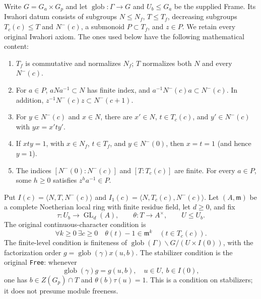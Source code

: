 \documentclass[11pt,a4paper]{article}
\numberwithin{equation}{section}
\theoremstyle{remark}\newtheorem{remark}[theorem]{Remark}
\begin{document}
Write $G=G_a\times G_p$ and let $\operatorname{glob}:\Gamma\to G$
and $U_b\leq G_a$ be the supplied Frame.  Its Iwahori datum consists of
subgroups $N\leq N_f$, $T\leq T_f$, decreasing subgroups
$T_c(c)\leq T$ and $N^-(c)$, a submonoid $P\subset T_f$, and
$z\in P$.  We retain every original Iwahori axiom.  The ones used
below have the following mathematical content:

\begin{enumerate}
\item $T_f$ is commutative and normalizes $N_f$; $T$ normalizes
both $N$ and every $N^-(c)$.
\item For $a\in P$, $aNa^{-1}\subset N$ has finite index, and
$a^{-1}N^-(c)a\subset N^-(c)$.  In addition,
$z^{-1}N^-(c)z\subset N^-(c+1)$.
\item For $y\in N^-(c)$ and $x\in N$, there are
$x'\in N$, $t\in T_c(c)$, and $y'\in N^-(c)$ with
$yx=x'ty'$.
\item If $xty=1$, with $x\in N_f$, $t\in T_f$, and
$y\in N^-(0)$, then $x=t=1$ (and hence $y=1$).
\item The indices $[N^-(0):N^-(c)]$ and $[T:T_c(c)]$ are
finite.  For every $a\in P$, some $h\geq0$ satisfies
$z^h a^{-1}\in P$.
\end{enumerate}

Put $I(c)=\langle N,\allowbreak{} T,\allowbreak{} N^-(c)\rangle$ and
$I_1(c)=\langle N,\allowbreak{} T_c(c),\allowbreak{} N^-(c)\rangle$.  Let $(A,\mathfrak m)$
be a complete Noetherian local ring with finite residue field, let
$d\geq0$, and fix
\[
 \tau:U_b\longrightarrow\operatorname{GL}_d(A),\qquad
 \theta:T\longrightarrow A^\times,\qquad U\leq U_b.
\]
The original continuous-character condition is
\begin{equation}\label{eq:ost-contchar}
 \forall k\geq0\ \exists c\geq0\quad
             \theta(t)-1\in\mathfrak m^k\quad(t\in T_c(c)).
\end{equation}
The finite-level condition is finiteness of
$\operatorname{glob}(\Gamma)\backslash G/(U\times I(0))$,
with the factorization order
$g=\operatorname{glob}(\gamma)x(u,\allowbreak{} b)$.  The stabilizer condition
is the original \texttt{Free}: whenever
\begin{equation}\label{eq:ost-stabilizer}
 \operatorname{glob}(\gamma)g=g(u,\allowbreak{} b),\quad u\in U,\ b\in I(0),
\end{equation}
one has $b\in Z(G_p)\cap T$ and $\theta(b)\tau(u)=1$.
This is a condition on stabilizers; it does not presume module freeness.
\end{document}
